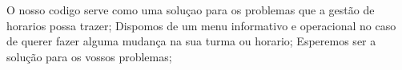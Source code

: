 O nosso codigo serve como uma soluçao para os problemas que a gestão de horarios possa trazer; Dispomos de um menu informativo e operacional no caso de querer fazer alguma mudança na sua turma ou horario; Esperemos ser a solução para os vossos problemas; 